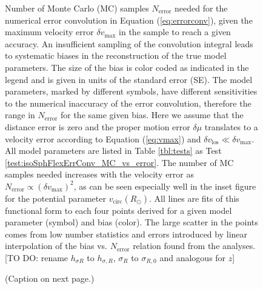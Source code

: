 
\begin{figure}
\caption{Number of Monte Carlo (MC) samples $N_\text{error}$ needed for the numerical error convolution in Equation (\ref{eq:errorconv}), given the maximum velocity error $\delta v_\text{max}$ in the sample to reach a given accuracy.  An insufficient sampling of the convolution integral leads to systematic biases in the reconstruction of the true model parameters. The size of the bias is color coded as indicated in the legend and is given in units of the standard error (SE).  The model parameters, marked by different symbols, have different sensitivities to the numerical inaccuracy of the error convolution, therefore the range in $N_\text{error}$ for the same given bias. Here we assume that the distance error is zero and the proper motion error $\delta \mu$ translates to a velocity error according to Equation (\ref{eq:vmax}) and $\delta v_\text{los} \ll \delta v_\text{max}$. All model parameters are listed in Table \ref{tbl:tests} as Test \ref{test:isoSphFlexErrConv_MC_vs_error}. The number of MC samples needed increases with the velocity error as $N_\text{error} \propto \left( \delta v_\text{max} \right)^2$, as can be seen especially well in the inset figure for the potential parameter $v_\text{circ}(R_\odot)$. All lines are fits of this functional form to each four points derived for a given model parameter (symbol) and bias (color). The large scatter in the points comes from low number statistics and errors introduced by linear interpolation of the bias vs. $N_\text{error}$ relation found from the analyses. [TO DO: rename $h_{\sigma R}$ to $h_{\sigma,R}$, $\sigma_R$ to $\sigma_{R,0}$ and analogous for $z$]}
\label{fig:isoSphFlexErrConv_MC_vs_error}
\end{figure}



\begin{figure}
\caption{(Caption on next page.)}
\end{figure}

